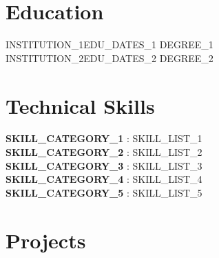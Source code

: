 \section{Education}
  \resumeSubHeadingListStart
    \resumeSubheading
      {{{INSTITUTION_1}}}{{{EDU_DATES_1}}}
      {{{DEGREE_1}}}{}
    \resumeSubheading
      {{{INSTITUTION_2}}}{{{EDU_DATES_2}}}
      {{{DEGREE_2}}}{}
  \resumeSubHeadingListEnd

\section{Technical Skills}
\begin{itemize}[leftmargin=0.0in, label={}]
    \small{\item{
        \textbf{ {{SKILL_CATEGORY_1}} }{: {{SKILL_LIST_1}} } \\
        \textbf{ {{SKILL_CATEGORY_2}} }{: {{SKILL_LIST_2}} } \\
        \textbf{ {{SKILL_CATEGORY_3}} }{: {{SKILL_LIST_3}} } \\
        \textbf{ {{SKILL_CATEGORY_4}} }{: {{SKILL_LIST_4}} } \\
        \textbf{ {{SKILL_CATEGORY_5}} }{: {{SKILL_LIST_5}} }
    }}
\end{itemize}
\vspace{-4pt}

\section{Projects}
  \resumeSubHeadingListStart

      \resumeItemListStart
      \resumeItemListEnd

      \resumeItemListStart
      \resumeItemListEnd

